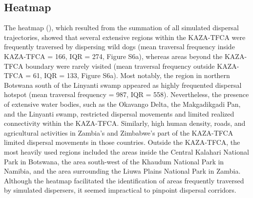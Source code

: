 \documentclass[abstract=on,10pt,a4paper,bibliography=totocnumbered]{article}
\begin{document}
\subsection{Heatmap}
The heatmap (), which resulted from the summation of all simulated
dispersal trajectories, showed that several extensive regions within the
KAZA-TFCA were frequently traversed by dispersing wild dogs (mean traversal
frequency inside KAZA-TFCA = 166, IQR = 274, Figure S6a), whereas areas beyond
the KAZA-TFCA boundary were rarely visited (mean traversal frequency outside
KAZA-TFCA = 61, IQR = 133, Figure S6a). Most notably, the region in northern
Botswana south of the Linyanti swamp appeared as highly frequented dispersal
hotspot (mean traversal frequency = 987, IQR = 558). Nevertheless, the presence
of extensive water bodies, such as the Okavango Delta, the Makgadikgadi Pan, and
the Linyanti swamp, restricted dispersal movements and limited realized
connectivity within the KAZA-TFCA. Similarly, high human density, roads, and
agricultural activities in Zambia's and Zimbabwe's part of the KAZA-TFCA limited
dispersal movements in those countries. Outside the KAZA-TFCA, the most heavily
used regions included the areas inside the Central Kalahari National Park in
Botswana, the area south-west of the Khaudum National Park in Namibia, and the
area surrounding the Liuwa Plains National Park in Zambia. Although the heatmap
facilitated the identification of areas frequently traversed by simulated
dispersers, it seemed impractical to pinpoint dispersal corridors.
\end{document}
